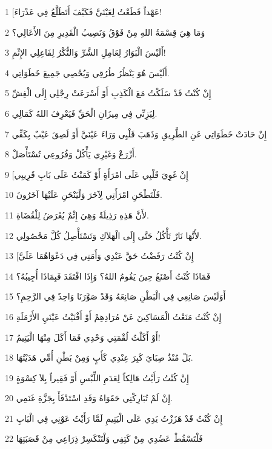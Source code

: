 \par 1 [عَهْداً قَطَعْتُ لِعَيْنَيَّ فَكَيْفَ أَتَطَلَّعُ فِي عَذْرَاءَ!
\par 2 وَمَا هِيَ قِسْمَةُ اللهِ مِنْ فَوْقُ وَنَصِيبُ الْقَدِيرِ مِنَ الأَعَالِي؟
\par 3 أَلَيْسَ الْبَوَارُ لِعَامِلِ الشَّرِّ وَالنُّكْرُ لِفَاعِلِي الإِثْمِ!
\par 4 أَلَيْسَ هُوَ يَنْظُرُ طُرُقِي وَيُحْصِي جَمِيعَ خَطَوَاتِي.
\par 5 إِنْ كُنْتُ قَدْ سَلَكْتُ مَعَ الْكَذِبِ أَوْ أَسْرَعَتْ رِجْلِي إِلَى الْغِشِّ
\par 6 لِيَزِنِّي فِي مِيزَانِ الْحَقِّ فَيَعْرِفَ اللهُ كَمَالِي.
\par 7 إِنْ حَادَتْ خَطَوَاتِي عَنِ الطَّرِيقِ وَذَهَبَ قَلْبِي وَرَاءَ عَيْنَيَّ أَوْ لَصِقَ عَيْبٌ بِكَفِّي
\par 8 أَزْرَعْ وَغَيْرِي يَأْكُلْ وَفُرُوعِي تُسْتَأْصَلْ.
\par 9 [إِنْ غَوِيَ قَلْبِي عَلَى امْرَأَةٍ أَوْ كَمَنْتُ عَلَى بَابِ قَرِيبِي
\par 10 فَلْتَطْحَنِ امْرَأَتِي لِآخَرَ وَلْيَنْحَنِ عَلَيْهَا آخَرُونَ.
\par 11 لأَنَّ هَذِهِ رَذِيلَةٌ وَهِيَ إِثْمٌ يُعْرَضُ لِلْقُضَاةِ.
\par 12 لأَنَّهَا نَارٌ تَأْكُلُ حَتَّى إِلَى الْهَلاَكِ وَتَسْتَأْصِلُ كُلَّ مَحْصُولِي.
\par 13 [إِنْ كُنْتُ رَفَضْتُ حَقَّ عَبْدِي وَأَمَتِي فِي دَعْوَاهُمَا عَلَيَّ
\par 14 فَمَاذَا كُنْتُ أَصْنَعُ حِينَ يَقُومُ اللهُ؟ وَإِذَا افْتَقَدَ فَبِمَاذَا أُجِيبُهُ؟
\par 15 أَوَلَيْسَ صَانِعِي فِي الْبَطْنِ صَانِعَهُ وَقَدْ صَوَّرَنَا وَاحِدٌ فِي الرَّحِمِ؟
\par 16 إِنْ كُنْتُ مَنَعْتُ الْمَسَاكِينَ عَنْ مُرَادِهِمْ أَوْ أَفْنَيْتُ عَيْنَيِ الأَرْمَلَةِ
\par 17 أَوْ أَكَلْتُ لُقْمَتِي وَحْدِي فَمَا أَكَلَ مِنْهَا الْيَتِيمُ!
\par 18 بَلْ مُنْذُ صِبَايَ كَبِرَ عِنْدِي كَأَبٍ وَمِنْ بَطْنِ أُمِّي هَدَيْتُهَا.
\par 19 إِنْ كُنْتُ رَأَيْتُ هَالِكاً لِعَدَمِ اللِّبْسِ أَوْ فَقِيراً بِلاَ كِسْوَةٍ
\par 20 إِنْ لَمْ تُبَارِكْنِي حَقَوَاهُ وَقَدِ اسْتَدْفَأَ بِجَزَّةِ غَنَمِي.
\par 21 إِنْ كُنْتُ قَدْ هَزَزْتُ يَدِي عَلَى الْيَتِيمِ لَمَّا رَأَيْتُ عَوْنِي فِي الْبَابِ
\par 22 فَلْتَسْقُطْ عَضُدِي مِنْ كَتِفِي وَلْتَنْكَسِرْ ذِرَاعِي مِنْ قَصَبَتِهَا
